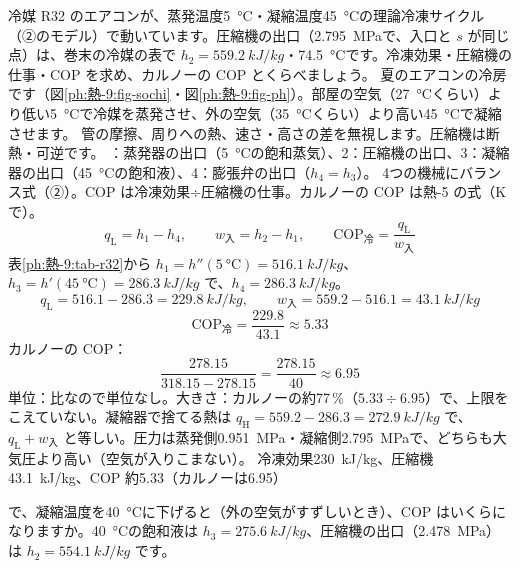 \begin{phreidai}[エアコンの理論冷凍サイクル（R32）]
\label{ph:熱-9:ex6}冷媒 R32 のエアコンが、蒸発温度\qty{5}{\celsius}・凝縮温度\qty{45}{\celsius}の理論冷凍サイクル（②のモデル）で動いています。圧縮機の出口（\qty{2.795}{MPa}で、入口と $s$ が同じ点）は、巻末の冷媒の表で $h_2=\qty{559.2}{kJ/kg}$・\qty{74.5}{\celsius}です。冷凍効果・圧縮機の仕事・COP を求め、カルノーの COP とくらべましょう。
\phbamen
夏のエアコンの冷房です（図\ref{ph:熱-9:fig-sochi}・図\ref{ph:熱-9:fig-ph}）。部屋の空気（\qty{27}{\celsius}くらい）より低い\qty{5}{\celsius}で冷媒を蒸発させ、外の空気（\qty{35}{\celsius}くらい）より高い\qty{45}{\celsius}で凝縮させます。
\phmushi
管の摩擦、周りへの熱、速さ・高さの差を無視します。圧縮機は断熱・可逆です。
：蒸発器の出口（\qty{5}{\celsius}の飽和蒸気）、2：圧縮機の出口、3：凝縮器の出口（\qty{45}{\celsius}の飽和液）、4：膨張弁の出口（$h_4=h_3$）。
\phriyu
4つの機械にバランス式（②）。COP は冷凍効果÷圧縮機の仕事。カルノーの COP は熱-5 の式（K で）。
\phtateru
\[ q_{\mathrm L}=h_1-h_4,\qquad w_{\text{入}}=h_2-h_1,\qquad \mathrm{COP}_{\text{冷}}=\frac{q_{\mathrm L}}{w_{\text{入}}} \]
\phtoku
表\ref{ph:熱-9:tab-r32}から $h_1=h''(\qty{5}{\celsius})=\qty{516.1}{kJ/kg}$、$h_3=h'(\qty{45}{\celsius})=\qty{286.3}{kJ/kg}$ で、$h_4=\qty{286.3}{kJ/kg}$。
\[ q_{\mathrm L}=516.1-286.3=\qty{229.8}{kJ/kg},\qquad w_{\text{入}}=559.2-516.1=\qty{43.1}{kJ/kg} \]
\[ \mathrm{COP}_{\text{冷}}=\frac{229.8}{43.1}\approx5.33 \]
カルノーの COP：
\[ \frac{278.15}{318.15-278.15}=\frac{278.15}{40}\approx6.95 \]
\phtashikame
単位：比なので単位なし。大きさ：カルノーの約77\,\%（$5.33\div6.95$）で、上限をこえていない。凝縮器で捨てる熱は $q_{\mathrm H}=559.2-286.3=\qty{272.9}{kJ/kg}$ で、$q_{\mathrm L}+w_{\text{入}}$ と等しい。圧力は蒸発側\qty{0.951}{MPa}・凝縮側\qty{2.795}{MPa}で、どちらも大気圧より高い（空気が入りこまない）。
\kotae 冷凍効果\qty{230}{kJ/kg}、圧縮機\qty{43.1}{kJ/kg}、COP 約5.33（カルノーは6.95）
\end{phreidai}
\begin{jibun}
で、凝縮温度を\qty{40}{\celsius}に下げると（外の空気がすずしいとき）、COP はいくらになりますか。\qty{40}{\celsius}の飽和液は $h_3=\qty{275.6}{kJ/kg}$、圧縮機の出口（\qty{2.478}{MPa}）は $h_2=\qty{554.1}{kJ/kg}$ です。
\end{jibun}

